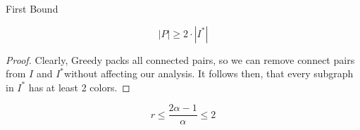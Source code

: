 \begin{frame}{First Bound}
	
\begin{lemma}
$$ |P| \geq 2 \cdot |I^*| $$
\end{lemma}

\pause\begin{proof}
Clearly, Greedy packs all connected pairs, so we can remove connect pairs 
from $I$ and $I^*$without affecting our analysis. 
It follows then, that every subgraph in $I^*$ has at least 2 colors. 
\end{proof}

\pause\begin{corollary}
$$r \leq \frac{2 \alpha - 1}{\alpha} \leq 2$$
\end{corollary}


\end{frame}

